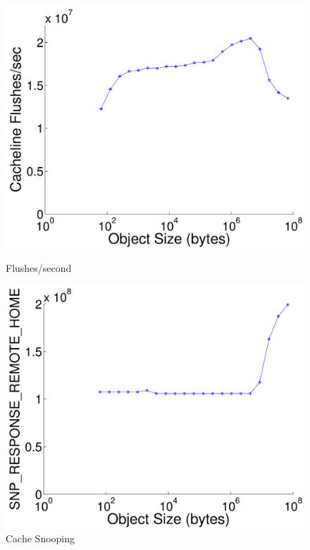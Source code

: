\begin{figure}[t]
\begin{minipage}[b]{0.49\linewidth}
\includegraphics[width=\columnwidth]{figs/flushes_per_sec}
\caption{Flushes/second}
\label{fig:flushes_per_sec}
\end{minipage}
\begin{minipage}[b]{0.49\linewidth}
\includegraphics[width=\columnwidth]{figs/snoop_response}
\caption{Cache Snooping}
\label{fig:ext_snoop}
\end{minipage}
\end{figure}

